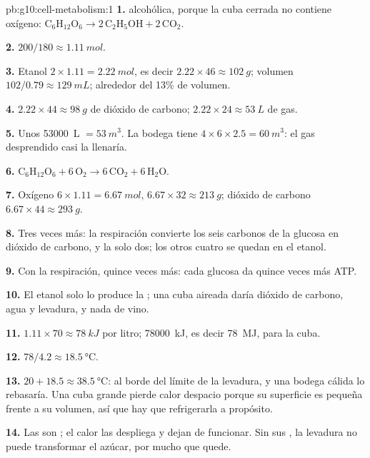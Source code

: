 \begin{solution}{pb:g10:cell-metabolism:1}
\textbf{1.}  alcohólica, porque la cuba cerrada no
contiene oxígeno: $\mathrm{C_6H_{12}O_6} \to 2\,\mathrm{C_2H_5OH} +
2\,\mathrm{CO_2}$.

\textbf{2.} $200/180 \approx \qty{1.11}{mol}$.

\textbf{3.} Etanol $2 \times 1.11 = \qty{2.22}{mol}$, es decir $2.22
\times 46 \approx \qty{102}{g}$; volumen $102/0.79 \approx
\qty{129}{mL}$; alrededor del 13\% de volumen.

\textbf{4.} $2.22 \times 44 \approx \qty{98}{g}$ de dióxido de
carbono; $2.22 \times 24 \approx \qty{53}{L}$ de gas.

\textbf{5.} Unos \qty{53000}{L} $= \qty{53}{m^3}$. La bodega tiene
$4 \times 6 \times 2.5 = \qty{60}{m^3}$: el gas desprendido casi la
llenaría.

\textbf{6.} $\mathrm{C_6H_{12}O_6} + 6\,\mathrm{O_2} \to
6\,\mathrm{CO_2} + 6\,\mathrm{H_2O}$.

\textbf{7.} Oxígeno $6 \times 1.11 = \qty{6.67}{mol}$, $6.67 \times 32
\approx \qty{213}{g}$; dióxido de carbono $6.67 \times 44 \approx
\qty{293}{g}$.

\textbf{8.} Tres veces más: la respiración convierte los seis carbonos
de la glucosa en dióxido de carbono, y la  solo dos; los
otros cuatro se quedan en el etanol.

\textbf{9.} Con la respiración, quince veces más: cada glucosa da
quince veces más ATP.

\textbf{10.} El etanol solo lo produce la ; una cuba
aireada daría dióxido de carbono, agua y levadura, y nada de vino.

\textbf{11.} $1.11 \times 70 \approx \qty{78}{kJ}$ por litro;
\qty{78000}{kJ}, es decir \qty{78}{MJ}, para la cuba.

\textbf{12.} $78/4.2 \approx \qty{18.5}{\celsius}$.

\textbf{13.} $20 + 18.5 \approx \qty{38.5}{\celsius}$: al borde del
límite de la levadura, y una bodega cálida lo rebasaría. Una cuba
grande pierde calor despacio porque su superficie es pequeña frente a
su volumen, así que hay que refrigerarla a propósito.

\textbf{14.} Las  son ; el calor las despliega y dejan
de funcionar. Sin sus , la levadura no puede transformar el
azúcar, por mucho que quede.


\end{solution}
